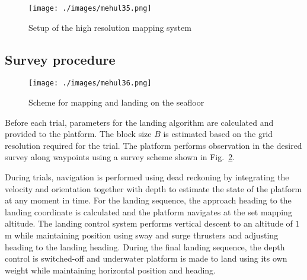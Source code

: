 \begin{figure}[!ht]
\centering\texttt{[image: ./images/mehul35.png]}
\caption{Setup of the high resolution mapping system}
\label{f:laser_system}
\end{figure}


\subsection{Survey procedure}

\begin{figure}[!ht]
\centering\texttt{[image: ./images/mehul36.png]}
\caption{Scheme for mapping and landing on the seafloor}
\label{f:flow_mission}
\end{figure}

Before each trial, parameters for the landing algorithm are calculated and provided to the platform. The block size $B$ is estimated based on the grid resolution required for the trial. The platform performs observation in the desired survey along waypoints using a survey scheme shown in Fig.~\ref{f:flow_mission}.

 During trials, navigation is performed using dead reckoning by integrating the velocity and orientation together with depth to estimate the state of the platform at any moment in time. For the landing sequence, the approach heading to the landing coordinate is calculated and the platform navigates at the set mapping altitude. The landing control system performs vertical descent to an altitude of $1$ m while maintaining position using sway and surge thrusters and adjusting heading to the landing heading. During the final landing sequence, the depth control is switched-off and underwater platform is made to land using its own weight while maintaining horizontal position and heading.
 